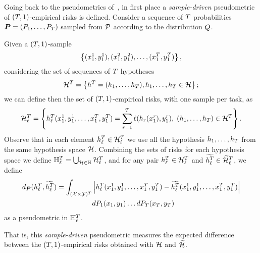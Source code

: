 Going back to the pseudometrics of~\citet{baxter2000model}, in first place a \emph{sample-driven} pseudometric of $(T, 1)$-empirical risks is defined.
Consider a sequence of $T$ probabilities $\bm{P} = (P_1, \ldots, P_T)$ sampled from $\mathcal{P}$ according to the distribution $Q$. 
\begin{definition}
    \label{def:sample_pseudometric}
    Given a $(T, 1)$-sample 
    $$\left\{(x_1^1, y_1^1), (x_1^2, y_1^2), \ldots, (x_1^T, y_1^T) \right\},$$
    considering the set of sequences of $T$ hypotheses 
$$\mathcal{H}^T = \left\{ h^T = (h_1, \ldots, h_T) , h_1, \ldots, h_T \in \mathcal{H}\right\} ;$$
 we can define then the set of $(T, 1)$-empirical risks, with one sample per task, as 
$$
\mathcal{H}^T_\ell = \left\{ {h}^T_\ell(x_1^1, y_1^1, \ldots, x_1^T, y_1^T) = \sum_{r=1}^T \ell(h_r(x_1^r), y_1^r) ,\;  (h_1, \ldots, h_T) \in \mathcal{H}^T\right\} .
$$
Observe that in each element ${h}^T_\ell \in \mathcal{H}^T_\ell$ we use all the hypothesis $h_1, \ldots, h_T$ from the same hypothesis space $\mathcal{H}$.
Combining the sets of risks for each hypothesis space we define $\mathbb{H}^{T}_\ell = \bigcup_{\mathcal{H} \in \mathbb{H}} \mathcal{H}^T_\ell$, and for any pair ${h}^T_\ell \in \mathcal{H}^T_\ell$ and  $\widetilde{h^T_\ell} \in \widetilde{\mathcal{H}}^T_\ell$, we define
\begin{equation}
    \nonumber
    \begin{aligned}
        d_{\bm{P}}({h}^T_\ell, \widetilde{h^T_\ell}) = \int_{(\mathcal{X} \times \mathcal{Y})^{T}} &\left|{h}^T_\ell(x_1^1, y_1^1, \ldots, x_1^T, y_1^T) - \widetilde{h^T_\ell} (x_1^1, y_1^1, \ldots, x_1^T, y_1^T)\right| \\ 
        & d{P_1}(x_1, y_1) \ldots d{P_T}(x_T, y_T)
    \end{aligned}
\end{equation}
as a pseudometric in $\mathbb{H}_\ell^T$.
\end{definition}
%
That is, this \emph{sample-driven} pseudometric measures the expected difference between the $(T, 1)$-empirical risks obtained with $\mathcal{H}$ and $\widetilde{\mathcal{H}}$.

